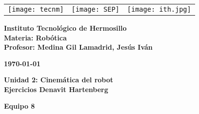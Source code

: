 \begin{titlepage}
	\centering
	\begin{tabular}{@{}p{} p{} p{}@{}}
		\texttt{[image: tecnm]} & 
		\centering \texttt{[image: SEP]} & 
		\raggedleft \texttt{[image: ith.jpg]} \\
	\end{tabular}
	
	\vspace{2em}
	
	\noindent
	\begin{minipage}[t]{0.48\textwidth}
		\raggedright
		\small \textbf{%
			Instituto Tecnológico de Hermosillo\\
			Materia: Robótica\\
			Profesor: Medina Gil Lamadrid, Jesús Iván%
		}
	\end{minipage}%
	\hfill
	\begin{minipage}[t]{0.48\textwidth}
		\raggedleft
		\small \textbf{\today}
	\end{minipage}
	
	\vspace{2em}
	
	{\large \textbf{Unidad 2: Cinemática del robot}}\\
	
	\vspace{1em}
	{\Huge \textbf{Ejercicios Denavit Hartenberg}}
		
	\vspace{1em}
	
	\begin{center}
		{\Large \textbf{Equipo 8}}
	\end{center}
	
	\vspace{1em}
	

\end{titlepage}
